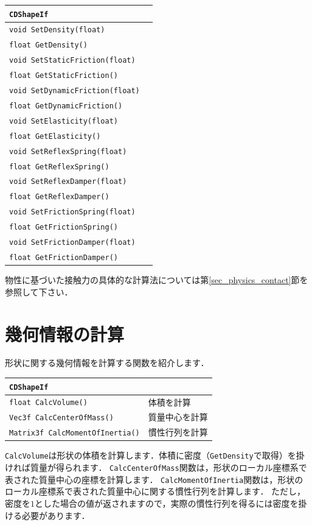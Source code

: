 \begin{center}
\begin{tabular}{lll}
\multicolumn{3}{l}{\texttt{CDShapeIf}}						\\ \midrule
\multicolumn{2}{l}{\texttt{void SetDensity(float)}}				& \\
\multicolumn{2}{l}{\texttt{float GetDensity()}}					& \\
\multicolumn{2}{l}{\texttt{void SetStaticFriction(float)}}		& \\
\multicolumn{2}{l}{\texttt{float GetStaticFriction()}}			& \\
\multicolumn{2}{l}{\texttt{void SetDynamicFriction(float)}}		& \\
\multicolumn{2}{l}{\texttt{float GetDynamicFriction()}}			& \\
\multicolumn{2}{l}{\texttt{void SetElasticity(float)}}			& \\
\multicolumn{2}{l}{\texttt{float GetElasticity()}}				& \\
\multicolumn{2}{l}{\texttt{void SetReflexSpring(float)}}		& \\
\multicolumn{2}{l}{\texttt{float GetReflexSpring()}}			& \\
\multicolumn{2}{l}{\texttt{void SetReflexDamper(float)}}		& \\
\multicolumn{2}{l}{\texttt{float GetReflexDamper()}}			& \\
\multicolumn{2}{l}{\texttt{void SetFrictionSpring(float)}}		& \\
\multicolumn{2}{l}{\texttt{float GetFrictionSpring()}}			& \\
\multicolumn{2}{l}{\texttt{void SetFrictionDamper(float)}}		& \\
\multicolumn{2}{l}{\texttt{float GetFrictionDamper()}}			& \\
\end{tabular}
\end{center}

\KLUDGE 物性に基づいた接触力の具体的な計算法については第\ref{sec_physics_contact}節を参照して下さい．

\section{幾何情報の計算}

\KLUDGE 形状に関する幾何情報を計算する関数を紹介します．

\begin{center}
\begin{tabular}{lll}
\multicolumn{3}{l}{\texttt{CDShapeIf}}							\\ \midrule
\multicolumn{2}{l}{\texttt{float CalcVolume()}}					& 体積を計算		\\
\multicolumn{2}{l}{\texttt{Vec3f CalcCenterOfMass()}}			& 質量中心を計算	\\
\multicolumn{2}{l}{\texttt{Matrix3f CalcMomentOfInertia()}}		& 慣性行列を計算	\\
\end{tabular}
\end{center}

\texttt{CalcVolume}は形状の体積を計算します．体積に密度（\texttt{GetDensity}で取得）を掛ければ質量が得られます．
\texttt{CalcCenterOfMass}関数は，形状のローカル座標系で表された質量中心の座標を計算します．
\texttt{CalcMomentOfInertia}関数は，形状のローカル座標系で表された質量中心に関する慣性行列を計算します．
\KLUDGE ただし，密度を$1$とした場合の値が返されますので，実際の慣性行列を得るには密度を掛ける必要があります．

